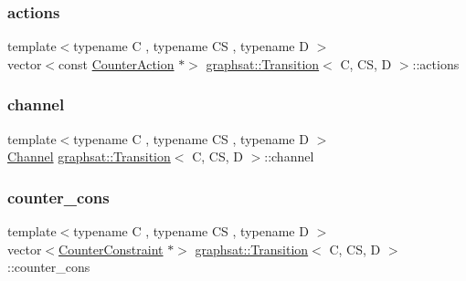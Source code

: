 \subsubsection{\texorpdfstring{actions}{actions}}
{\footnotesize\ttfamily template$<$typename C , typename CS , typename D $>$ \\
vector$<$const \mbox{\hyperlink{classgraphsat_1_1_counter_action}{Counter\+Action}} $\ast$$>$ \mbox{\hyperlink{classgraphsat_1_1_transition}{graphsat\+::\+Transition}}$<$ C, CS, D $>$\+::actions\hspace{0.3cm}{\ttfamily [private]}}

\mbox{\label{classgraphsat_1_1_transition_a35ba5cebf6ca15cd1be02930de7907a5}} 
\subsubsection{\texorpdfstring{channel}{channel}}
{\footnotesize\ttfamily template$<$typename C , typename CS , typename D $>$ \\
\mbox{\hyperlink{structgraphsat_1_1_channel}{Channel}} \mbox{\hyperlink{classgraphsat_1_1_transition}{graphsat\+::\+Transition}}$<$ C, CS, D $>$\+::channel\hspace{0.3cm}{\ttfamily [private]}}

\mbox{\label{classgraphsat_1_1_transition_a69466bc4b2339eac009773adcdf4870a}} 
\subsubsection{\texorpdfstring{counter\_cons}{counter\_cons}}
{\footnotesize\ttfamily template$<$typename C , typename CS , typename D $>$ \\
vector$<$\mbox{\hyperlink{classgraphsat_1_1_counter_constraint}{Counter\+Constraint}} $\ast$$>$ \mbox{\hyperlink{classgraphsat_1_1_transition}{graphsat\+::\+Transition}}$<$ C, CS, D $>$\+::counter\+\_\+cons\hspace{0.3cm}{\ttfamily [private]}}


